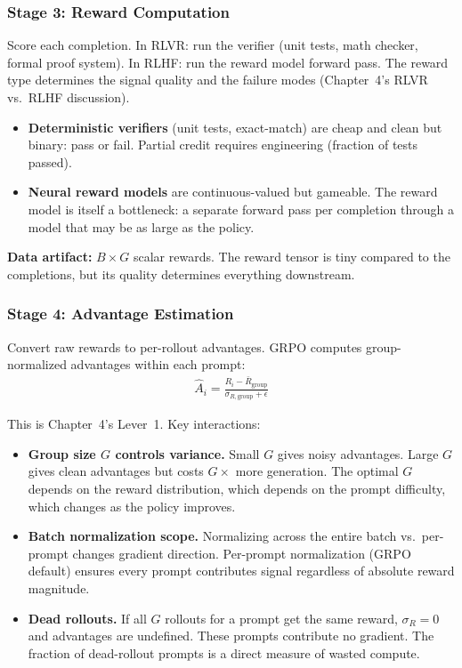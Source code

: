 \subsubsection*{Stage 3: Reward Computation}

Score each completion. In RLVR: run the verifier (unit tests, math checker, formal proof system). In RLHF: run the reward model forward pass. The reward type determines the signal quality and the failure modes (Chapter~4's RLVR vs.\ RLHF discussion).

\begin{itemize}
  \item \textbf{Deterministic verifiers} (unit tests, exact-match) are cheap and clean but binary: pass or fail. Partial credit requires engineering (fraction of tests passed).
  \item \textbf{Neural reward models} are continuous-valued but gameable. The reward model is itself a bottleneck: a separate forward pass per completion through a model that may be as large as the policy.
\end{itemize}

\textbf{Data artifact:} $B \times G$ scalar rewards. The reward tensor is tiny compared to the completions, but its quality determines everything downstream.

\subsubsection*{Stage 4: Advantage Estimation}

Convert raw rewards to per-rollout advantages. GRPO computes group-normalized advantages within each prompt:
\begin{align*}
  \hat{A}_i = \frac{R_i - \bar{R}_{\text{group}}}{\sigma_{R,\text{group}} + \epsilon}
\end{align*}

This is Chapter~4's Lever~1. Key interactions:
\begin{itemize}
  \item \textbf{Group size $G$ controls variance.} Small $G$ gives noisy advantages. Large $G$ gives clean advantages but costs $G\times$ more generation. The optimal $G$ depends on the reward distribution, which depends on the prompt difficulty, which changes as the policy improves.
  \item \textbf{Batch normalization scope.} Normalizing across the entire batch vs.\ per-prompt changes gradient direction. Per-prompt normalization (GRPO default) ensures every prompt contributes signal regardless of absolute reward magnitude.
  \item \textbf{Dead rollouts.} If all $G$ rollouts for a prompt get the same reward, $\sigma_{R} = 0$ and advantages are undefined. These prompts contribute no gradient. The fraction of dead-rollout prompts is a direct measure of wasted compute.
\end{itemize}

